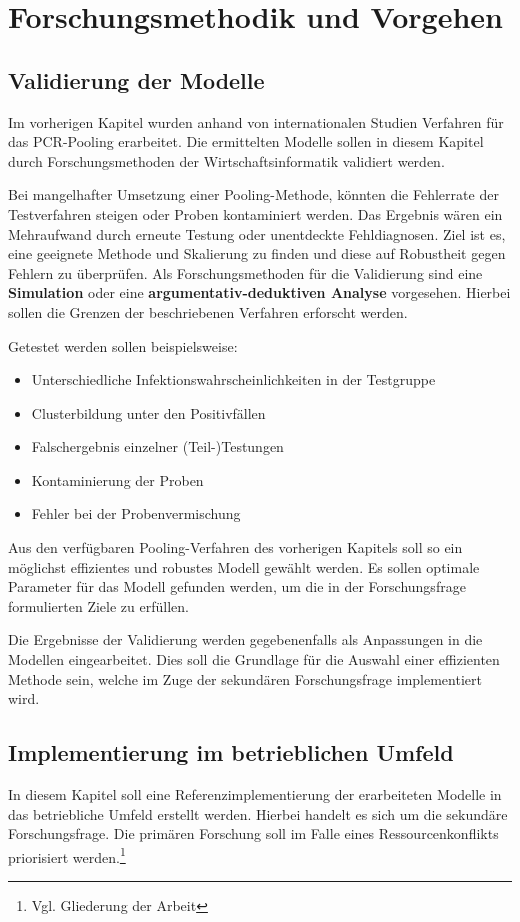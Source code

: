 
\chapter{Forschungsmethodik und Vorgehen}
\section{Validierung der Modelle}
Im vorherigen Kapitel wurden anhand von internationalen Studien Verfahren für das PCR-Pooling erarbeitet.
Die ermittelten Modelle sollen in diesem Kapitel durch Forschungsmethoden der Wirtschaftsinformatik validiert werden.

Bei mangelhafter Umsetzung einer Pooling-Methode, könnten die Fehlerrate der Testverfahren steigen oder Proben kontaminiert werden.
Das Ergebnis wären ein Mehraufwand durch erneute Testung oder unentdeckte Fehldiagnosen.
Ziel ist es, eine geeignete Methode und Skalierung zu finden und diese auf Robustheit gegen Fehlern zu überprüfen.
Als Forschungsmethoden für die Validierung sind eine \textbf{Simulation} oder eine \textbf{argumentativ-deduktiven Analyse} vorgesehen.
Hierbei sollen die Grenzen der beschriebenen Verfahren erforscht werden.

Getestet werden sollen beispielsweise:
\begin{itemize}
	\setlength{\itemsep}{-8pt}
	\item Unterschiedliche Infektionswahrscheinlichkeiten in der Testgruppe
	\item Clusterbildung unter den Positivfällen
	\item Falschergebnis einzelner (Teil-)Testungen
	\item Kontaminierung der Proben
	\item Fehler bei der Probenvermischung
\end{itemize}

Aus den verfügbaren Pooling-Verfahren des vorherigen Kapitels soll so ein möglichst effizientes und robustes Modell gewählt werden.
Es sollen optimale Parameter für das Modell gefunden werden, um die in der Forschungsfrage formulierten Ziele zu erfüllen.

Die Ergebnisse der Validierung werden gegebenenfalls als Anpassungen in die Modellen eingearbeitet.
Dies soll die Grundlage für die Auswahl einer effizienten Methode sein, welche im Zuge der sekundären Forschungsfrage implementiert wird.

\section{Implementierung im betrieblichen Umfeld}
In diesem Kapitel soll eine Referenzimplementierung der erarbeiteten Modelle in das betriebliche Umfeld erstellt werden.
Hierbei handelt es sich um die sekundäre Forschungsfrage.
Die primären Forschung soll im Falle eines Ressourcenkonflikts priorisiert werden.\footnote{Vgl. Gliederung der Arbeit}

